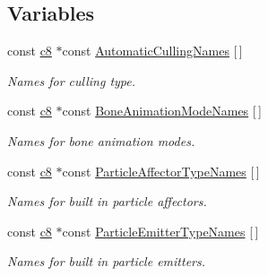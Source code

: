 \subsection*{Variables}
\begin{DoxyCompactItemize}
\item 
\mbox{\label{namespaceirr_1_1scene_a3565760a587dfa7394633e4ea6ddd65f}} 
const \hyperlink{namespaceirr_a9395eaea339bcb546b319e9c96bf7410}{c8} $\ast$const \hyperlink{namespaceirr_1_1scene_a3565760a587dfa7394633e4ea6ddd65f}{Automatic\+Culling\+Names} \mbox{[}$\,$\mbox{]}
\begin{DoxyCompactList}\small\item\em Names for culling type. \end{DoxyCompactList}\item 
\mbox{\label{namespaceirr_1_1scene_a7ee178269c868ac756c0ab769954e13d}} 
const \hyperlink{namespaceirr_a9395eaea339bcb546b319e9c96bf7410}{c8} $\ast$const \hyperlink{namespaceirr_1_1scene_a7ee178269c868ac756c0ab769954e13d}{Bone\+Animation\+Mode\+Names} \mbox{[}$\,$\mbox{]}
\begin{DoxyCompactList}\small\item\em Names for bone animation modes. \end{DoxyCompactList}\item 
\mbox{\label{namespaceirr_1_1scene_a134377ad375536dcf1acebdcca5465e5}} 
const \hyperlink{namespaceirr_a9395eaea339bcb546b319e9c96bf7410}{c8} $\ast$const \hyperlink{namespaceirr_1_1scene_a134377ad375536dcf1acebdcca5465e5}{Particle\+Affector\+Type\+Names} \mbox{[}$\,$\mbox{]}
\begin{DoxyCompactList}\small\item\em Names for built in particle affectors. \end{DoxyCompactList}\item 
\mbox{\label{namespaceirr_1_1scene_addc95cb56db5fa1703c1367491447e74}} 
const \hyperlink{namespaceirr_a9395eaea339bcb546b319e9c96bf7410}{c8} $\ast$const \hyperlink{namespaceirr_1_1scene_addc95cb56db5fa1703c1367491447e74}{Particle\+Emitter\+Type\+Names} \mbox{[}$\,$\mbox{]}
\begin{DoxyCompactList}\small\item\em Names for built in particle emitters. \end{DoxyCompactList}\item 

\end{DoxyCompactItemize}
